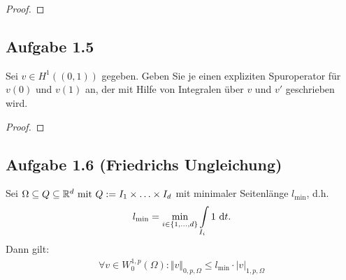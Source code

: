 \begin{proof}
\end{proof}

\subsection{Aufgabe 1.5}
Sei $v\in H^1((0,1))$ gegeben. 
Geben Sie je einen expliziten Spuroperator für $v(0)$ und $v(1)$ an, der mit Hilfe von Integralen über $v$ und $v'$ geschrieben wird.

\begin{proof}
\end{proof}

\subsection{Aufgabe 1.6 (Friedrichs Ungleichung)}
Sei $\Omega\subseteq Q\subseteq\mathbb{R}^d\text{ mit } Q:=I_1\times\ldots\times I_d$ mit minimaler Seitenlänge $l_{\min}$, d.h.
\begin{align*}
	l_{\min}=\min\limits_{i\in\lbrace1,\ldots,d\rbrace}\int\limits_{I_i} 1\text{ d} t.
\end{align*}
Dann gilt:
\begin{align*}
	\forall v\in W_0^{1,p}(\Omega):\Vert v\Vert_{0,p,\Omega}\leq l_{\min}\cdot|v|_{1,p,\Omega}
\end{align*}

